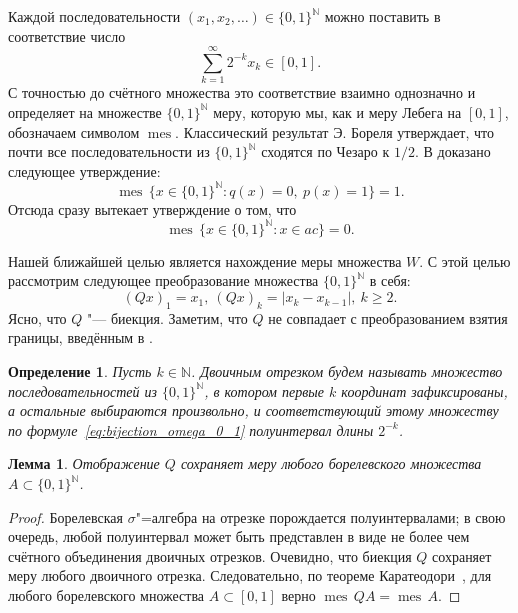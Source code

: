 \documentclass[12pt]{article}
\newtheorem{lem}[thm]{Лемма}
\newtheorem{dfn}[thm]{Определение}
\def\N{{\mathbb{N}}}
\DeclareMathOperator{\mes}{mes}
\begin{document}
Каждой последовательности $(x_1, x_2, \dots)\in \{0,1\}^\N$ можно поставить в соответствие число
\begin{equation}\label{eq:bijection_omega_0_1}
	\sum_{k=1}^\infty 2^{-k} x_k \in [0,1]
	.
\end{equation}
С точностью до счётного множества это соответствие взаимно однозначно и определяет на множестве $\{0,1\}^\N$ меру, которую мы, как и меру Лебега на $[0,1]$, обозначаем символом $\mes$. Классический результат Э. Бореля утверждает, что почти все последовательности из $\{0,1\}^\N$ сходятся по Чезаро к $1/2$. В \cite{SS} доказано следующее утверждение:
$$ \mes \, \{x\in \{0,1\}^\N: q(x)=0, \ p(x)=1\}=1.$$ Отсюда сразу вытекает утверждение \cite{Connor} о том, что
\begin{equation}\label{ac_meas}
\mes \, \{x\in \{0,1\}^\N: x\in ac\}=0.
\end{equation}

Нашей ближайшей целью является нахождение меры множества $W$. С этой целью рассмотрим следующее преобразование множества $\{0,1\}^\N$ в себя:
$$(Qx)_1=x_1, \ (Qx)_k=|x_k-x_{k-1}|, \ k\geqslant 2.$$
Ясно, что $Q$ "--- биекция.
Заметим, что $Q$ не совпадает с преобразованием взятия границы, введённым в \cite{keller1992invariant}.

\begin{dfn}
	Пусть $k\in\mathbb{N}$.
	Двоичным отрезком будем называть множество последовательностей из $\{0,1\}^\N$,
	в котором первые $k$ координат зафиксированы, а остальные выбираются произвольно,
	и соответствующий этому множеству по формуле~\eqref{eq:bijection_omega_0_1} полуинтервал длины $2^{-k}$.
\end{dfn}



\begin{lem}\label{lem:Q_Borel}
	Отображение $Q$ сохраняет меру любого борелевского множества $A\subset \{0,1\}^\N$.
\end{lem}

\begin{proof}
	Борелевская $\sigma$"=алгебра на отрезке порождается полуинтервалами;
	в свою очередь, любой полуинтервал может быть представлен в виде не более чем счётного объединения двоичных отрезков.
	Очевидно, что биекция $Q$ сохраняет меру любого двоичного отрезка.
	Следовательно, по теореме Каратеодори~\cite[теорема 1.53]{klenke2013probability}, для любого борелевского множества $A\subset [0,1]$ верно
	$\mes \, QA = \mes \, A$.
\end{proof}
\end{document}

